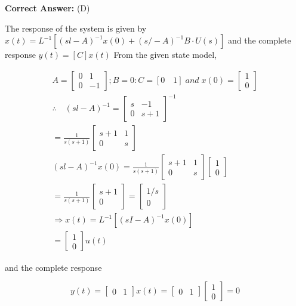 \documentclass[11pt,a4paper]{article}
\begin{document}
\noindent \textbf{Correct Answer:} (D)

\begin{tcolorbox}[solbox, title=Detailed Solution -- Question 80]
The response of the system is given by 
$x(t)=L^{-1}\left[(s l-A)^{-1} x(0)+(s /-A)^{-1} B \cdot U(s)\right]$
 and the complete response
$y(t)=[C] x(t)$
 From the given state model,

\[
\begin{array}{l} A=\left[\begin{array}{ll}0 & 1 \\ 0 & -1\end{array}\right] ; B=0: C=[0 \quad 1] \; and \;  x(0)=\left[\begin{array}{c}1 \\ 0\end{array}\right] \\ \therefore \quad(s l-A)^{-1}=\left[\begin{array}{cc}s & -1 \\ 0 & s+1\end{array}\right]^{-1} \\ =\frac{1}{s(s+1)}\left[\begin{array}{cc}s+1 & 1 \\ 0 & s\end{array}\right] \\ (s l-A)^{-1} x(0)=\frac{1}{s(s+1)}\left[\begin{array}{cc} s+1 & 1 \\ 0 & s \end{array}\right]\left[\begin{array}{c} 1 \\ 0 \end{array}\right] \\ =\frac{1}{s(s+1)}\left[\begin{array}{c} s+1 \\ 0 \end{array}\right]=\left[\begin{array}{c} 1 / s \\ 0 \end{array}\right] \\ \Rightarrow x(t)=L^{-1}\left[(s I-A)^{-1} x(0)\right] \\ =\left[\begin{array}{c} 1 \\ 0 \end{array}\right] u(t) \end{array}
\]

and the complete response 

\[
y(t)=\left[\begin{array}{lll}0 & 1\end{array}\right] x(t)=\left[\begin{array}{ll}0 & 1\end{array}\right]\left[\begin{array}{l}1 \\ 0\end{array}\right]=0
\]
\end{tcolorbox}
\end{document}
